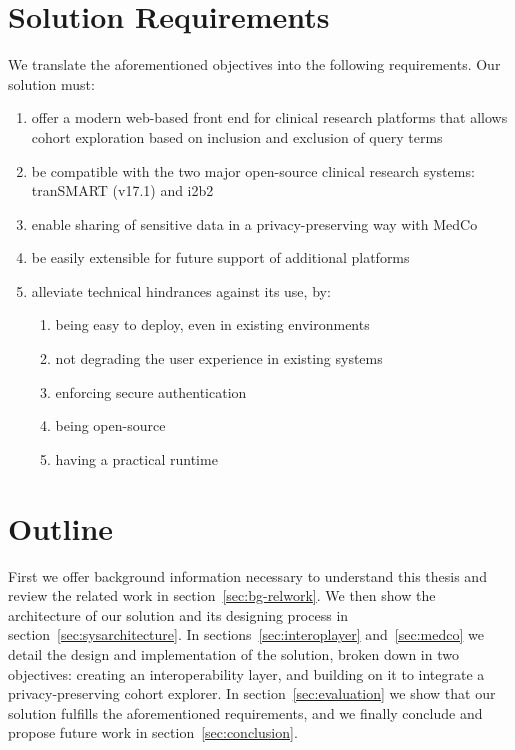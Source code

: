 \newpage
\section{Solution Requirements}
\label{sec:requirements}

We translate the aforementioned objectives into the following requirements.
Our solution must:

\begin{enumerate}
    \item offer a modern web-based front end for clinical research platforms that allows cohort exploration based on inclusion and exclusion of query terms
    \item be compatible with the two major open-source clinical research systems: tranSMART (v17.1) and i2b2
    \item enable sharing of sensitive data in a privacy-preserving way with MedCo
    \item be easily extensible for future support of additional platforms
    \item alleviate technical hindrances against its use, by:
    \begin{enumerate}
        \item being easy to deploy, even in existing environments
        \item not degrading the user experience in existing systems
        \item enforcing secure authentication
        \item being open-source
        \item having a practical runtime
    \end{enumerate}
\end{enumerate}



\section{Outline}

First we offer background information necessary to understand this thesis and review the related work in section~\ref{sec:bg-relwork}.
We then show the architecture of our solution and its designing process in  section~\ref{sec:sysarchitecture}.
In sections~\ref{sec:interoplayer} and~\ref{sec:medco} we detail the design and implementation of the solution, broken down in two objectives: creating an interoperability layer, and building on it to integrate a privacy-preserving cohort explorer.
In section~\ref{sec:evaluation} we show that our solution fulfills the aforementioned requirements, and we finally conclude and propose future work in section~\ref{sec:conclusion}.
